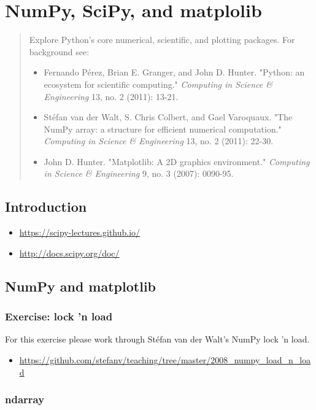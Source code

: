 \chapter{NumPy, SciPy, and matplolib}

\begin{abstract}
Explore Python's core numerical, scientific, and plotting packages. For background
see:
\begin{itemize}
\item Fernando Pérez, Brian E. Granger, and John D. Hunter. "Python: an ecosystem for
scientific computing." \emph{Computing in Science \& Engineering} 13, no. 2 (2011):
13-21.
\item Stéfan van der Walt, S. Chris Colbert, and Gael Varoquaux. "The NumPy array: a
structure for efficient numerical computation." \emph{Computing in Science \&
Engineering} 13, no. 2 (2011): 22-30.
\item John D. Hunter. "Matplotlib: A 2D graphics environment." \emph{Computing
in Science \& Engineering} 9, no. 3 (2007): 0090-95.
\end{itemize}
\end{abstract}

\section{Introduction}
\begin{itemize}
\item \url{https://scipy-lectures.github.io/}
\item \url{http://docs.scipy.org/doc/}
\end{itemize}

\section{NumPy and matplotlib}

\subsection{Exercise: lock 'n load}
For this exercise please work through Stéfan van der Walt's NumPy
lock 'n load.

\begin{itemize}
\item \url{https://github.com/stefanv/teaching/tree/master/2008_numpy_load_n_load}
\end{itemize}

\subsection{ndarray}

